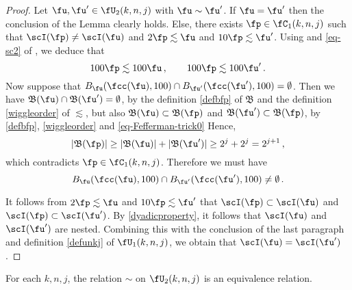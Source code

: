 \begin{proof}
    Let $\fu, \fu' \in \fU_2(k,n,j)$ with $\fu \sim \fu'$. If $\fu = \fu'$ then the conclusion of the Lemma clearly holds. Else, there exists $\fp \in \fC_1(k,n,j)$ such that $\scI(\fp) \ne \scI(\fu)$ and $2 \fp \lesssim \fu$ and $10 \fp \lesssim \fu'$.
    Using  and \eqref{eq-sc2} of , we deduce that
    \begin{equation}
        \label{eq-Fefferman-trick0}
        100 \fp\lesssim 100 \fu\,, \qquad 100 \fp \lesssim 100\fu'\,.
    \end{equation}
    Now suppose that $B_{\fu}(\fcc(\fu), 100) \cap B_{\fu'}(\fcc(\fu'), 100) = \emptyset$. Then we have $\mathfrak{B}(\fu) \cap \mathfrak{B}(\fu') = \emptyset$, by the definition \eqref{defbfp} of $\mathfrak{B}$ and the definition \eqref{wiggleorder} of $\lesssim$, but also $\mathfrak{B}(\fu) \subset \mathfrak{B}(\fp)$ and $\mathfrak{B}(\fu') \subset \mathfrak{B}(\fp)$, by \eqref{defbfp}, \eqref{wiggleorder} and \eqref{eq-Fefferman-trick0}
    Hence,
    $$
        |\mathfrak{B}(\fp)| \geq |\mathfrak{B}(\fu)| + |\mathfrak{B}(\fu')| \geq 2^{j} + 2^j = 2^{j+1}\,,
    $$
    which contradicts $\fp \in \fC_1(k,n,j)$. Therefore we must have
    \begin{equation*}
        B_{\fu}(\fcc(\fu), 100) \cap B_{\fu'}(\fcc(\fu'), 100) \ne \emptyset\, .
    \end{equation*}

    It follows from $2\fp \lesssim \fu$ and $10\fp \lesssim \fu'$ that $\scI(\fp) \subset \scI(\fu)$ and $\scI(\fp) \subset \scI(\fu')$. By \eqref{dyadicproperty}, it follows that $\scI(\fu)$ and $\scI(\fu')$ are nested.
    Combining this with the conclusion of the last paragraph and definition \eqref{defunkj} of $\fU_1(k,n,j)$, we obtain that $\scI(\fu) = \scI(\fu')$.
\end{proof}


\begin{lemma}
\label{equivalence-relation}
For each $k,n,j$, the relation $\sim$ on
$\fU_2(k,n,j)$ is an equivalence relation.
\end{lemma}

